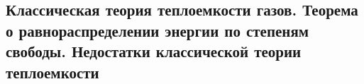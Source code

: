 \subsection{Классическая теория теплоемкости газов. Теорема о равнораспределении энергии по степеням свободы. Недостатки классической теории теплоемкости}